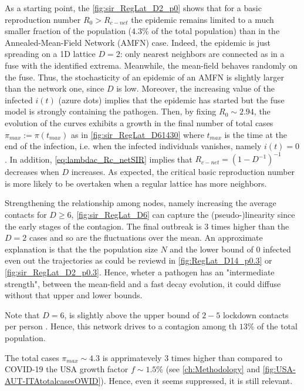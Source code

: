 \documentclass[a4paper,10pt,twoside]{book} %
\theoremstyle{definition}
\begin{document}
As a starting point, the \autoref{fig:sir_RegLat_D2_p0} shows that for a basic reproduction number $R_0 > R_{c-net}$ the epidemic remains limited to a much smaller fraction of the population ($4.3 \%$ of the total population) than in the Annealed-Mean-Field Network (AMFN) case. Indeed, the epidemic is just spreading on a 1D lattice $ D = 2$: only nearest neighbors are connected as in a fuse with the identified extrema. Meanwhile, the mean-field behaves randomly on the fuse. Thus, the stochasticity of an epidemic of an AMFN is slightly larger than the network one, since $ D$ is low. Moreover, the increasing value of the infected $i(t)$ (azure dots) implies that the epidemic has started but the fuse model is strongly containing the pathogen. Then, by fixing $R_0 \sim 2.94$, the evolution of the curves exhibits a growth in the final number of total cases $ \pi_{max}:= \pi(t_{max})$ as in \autoref{fig:sir_RegLat_D61430} where $ t_{max}$ is the time at the end of the infection, i.e. when the infected individuals vanishes, namely $i(t) = 0$.
In addition, \autoref{eq:lambdac_Rc_netSIR} implies that $R_{c-net} = (1-D^{-1})^{-1}$ decreases when $D$ increases. As expected, the critical basic reproduction number is more likely to be overtaken when a regular lattice has more neighbors.

Strengthening the relationship among nodes, namely increasing the average contacts for $D \geq 6$, \autoref{fig:sir_RegLat_D6} can capture the (pseudo-)linearity since the early stages of the contagion. The final outbreak is $ 3$ times higher than the $ D=2$ cases and so are the fluctuations over the mean. An approximate explanation is that the the population size $N$ and the lower bound of $0$ infected even out the trajectories as could be reviewd in \autoref{fig:RegLat_D14_p0.3} or \autoref{fig:sir_RegLat_D2_p0.3}. Hence, wheter a pathogen has an "intermediate strength", between the mean-field and a fast decay evolution, it could diffuse without that upper and lower bounds. 

Note that $D = 6$, is slightly above the upper bound of $2-5$ lockdown contacts per person \cite{Liu::2021_Review_SContactPattern}. 
Hence, this network drives to a contagion among th $ 13\%$ of the total population. 

The total cases $ \pi_{max} \sim 4.3$ is apprimatevely $3$ times higher than compared to COVID-19 the USA growth factor $f \sim 1.5\%$ (see \autoref{ch:Methodology} and \autoref{fig:USA-AUT-ITAtotalcasesOWID}). Hence, even it seems suppressed, it is still relevant.
\end{document}
